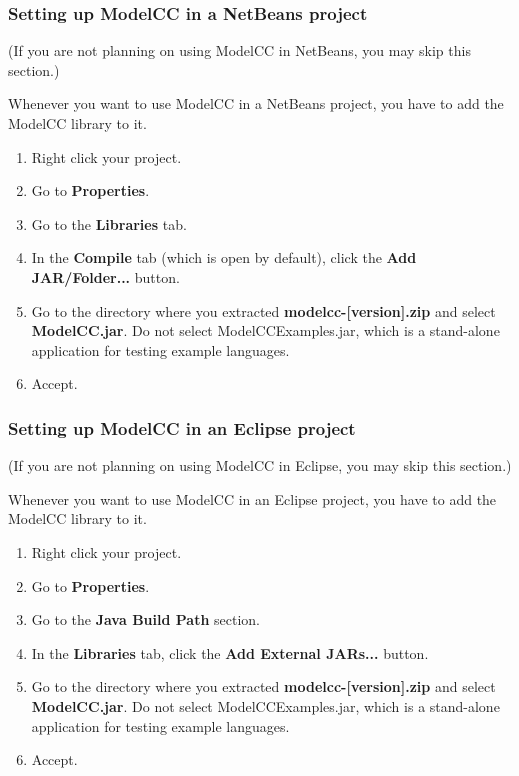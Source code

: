 \documentclass[a4paper,twoside,onecolumn]{article}
\begin{document}
\subsubsection{Setting up ModelCC in a NetBeans project}

(If you are not planning on using ModelCC in NetBeans, you may skip this section.)

Whenever you want to use ModelCC in a NetBeans project, you have to add the ModelCC library to it.

\begin{enumerate}
\item Right click your project.
\item Go to {\bf Properties}.
\item Go to the {\bf Libraries} tab.
\item In the {\bf Compile} tab (which is open by default), click the {\bf Add JAR/Folder...} button.
\item Go to the directory where you extracted {\bf modelcc-[version].zip} and select {\bf ModelCC.jar}. Do not select ModelCCExamples.jar, which is a stand-alone application for testing example languages.
\item Accept.
\end{enumerate}

\subsubsection{Setting up ModelCC in an Eclipse project}

(If you are not planning on using ModelCC in Eclipse, you may skip this section.)

Whenever you want to use ModelCC in an Eclipse project, you have to add the ModelCC library to it.

\begin{enumerate}
\item Right click your project.
\item Go to {\bf Properties}.
\item Go to the {\bf Java Build Path} section.
\item In the {\bf Libraries} tab, click the {\bf Add External JARs...} button.
\item Go to the directory where you extracted {\bf modelcc-[version].zip} and select {\bf ModelCC.jar}. Do not select ModelCCExamples.jar, which is a stand-alone application for testing example languages.
\item Accept.
\end{enumerate}
\end{document}
